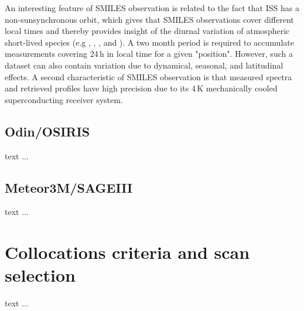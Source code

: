 An interesting feature of SMILES observation is related to the fact
that ISS has a non-sunsynchronous orbit, which gives that SMILES 
observations cover different local times and thereby provides insight
of the diurnal variation of atmospheric short-lived species
(e.g , , , and ). 
A two month period is required to accumulate measurements covering 
24\,h in local time for a given "position". However, such a 
dataset can also contain variation due to dynamical, seasonal, and 
latitudinal effects.
A second characteristic of SMILES observation is that 
measured spectra and retrieved profiles have high precision due 
to its 4\,K mechanically cooled superconducting receiver system.



\subsection{Odin/OSIRIS}
 
text ...

\subsection{Meteor3M/SAGEIII}

text ...


\section{Collocations criteria and scan selection}
 
text ...

